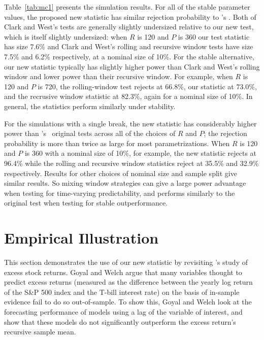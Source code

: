 \documentclass[12pt,fleqn]{article}
\newcommand\citepos[2][]{\citeauthor{#2}'s \citeyearpar[#1]{#2}}
\newcommand\poscw{\citeauthor{ClW:06}'s \citeyearpar{ClW:06,ClW:07}}
\theoremstyle{definition}
\begin{document}
Table~\ref{tab:mc1} presents the simulation results.  For all of the
stable parameter values, the proposed new statistic has similar
rejection probability to \citepos{ClW:07}.  Both of Clark and West's
tests are generally slightly undersized relative to our new test,
which is itself slightly undersized: when $R$ is 120 and $P$ is 360
our test statistic has size 7.6\% and Clark and West's rolling and
recursive window tests have size 7.5\% and 6.2\% respectively, at a
nominal size of 10\%.  For the stable alternative, our new statistic
typically has slightly higher power than Clark and West's rolling
window and lower power than their recursive window.  For example, when
$R$ is 120 and $P$ is 720, the rolling-window test rejects at 66.8\%,
our statistic at 73.0\%, and the recrusive window statistic at 82.3\%,
again for a nominal size of 10\%.  In general, the statistics perform
similarly under stability.

For the simulations with a single break, the new statistic has
considerably higher power than \poscw\ original tests across all of
the choices of $R$ and $P$; the rejection probability is more than
twice as large for most parametrizations.  When $R$ is 120 and $P$ is
360 with a nominal size of 10\%, for example, the new statistic
rejects at 96.4\% while the rolling and recursive window statistics
reject at 35.5\% and 32.9\% respectively.  Results for other choices
of nominal size and sample split give similar results.  So mixing
window strategies can give a large power advantage when testing for
time-varying predictability, and performs similarly to the original
test when testing for stable outperformance.

\section{Empirical Illustration}\label{sec:3}

This section demonstrates the use of our new statistic by revisiting
\citepos{GoW:08} study of excess stock returns.  Goyal and Welch argue
that many variables thought to predict excess returns (measured as the
difference between the yearly log return of the S\&P 500 index and the
T-bill interest rate) on the basis of in-sample evidence fail to do so
out-of-sample.  To show this, Goyal and Welch look at the forecasting
performance of models using a lag of the variable of interest, and
show that these models do not significantly outperform the excess
return's recursive sample mean.
\end{document}
